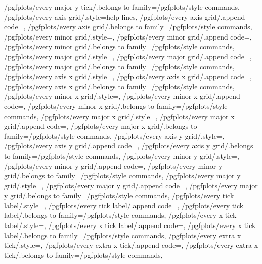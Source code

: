 {	/pgfplots/every major y tick/.belongs to family=/pgfplots/style commands,
	/pgfplots/every axis grid/.style={help lines},
	/pgfplots/every axis grid/.append code={},
	/pgfplots/every axis grid/.belongs to family=/pgfplots/style commands,
	/pgfplots/every minor grid/.style={},
	/pgfplots/every minor grid/.append code={},
	/pgfplots/every minor grid/.belongs to family=/pgfplots/style commands,
	/pgfplots/every major grid/.style={},
	/pgfplots/every major grid/.append code={},
	/pgfplots/every major grid/.belongs to family=/pgfplots/style commands,
	/pgfplots/every axis x grid/.style={},
	/pgfplots/every axis x grid/.append code={},
	/pgfplots/every axis x grid/.belongs to family=/pgfplots/style commands,
	/pgfplots/every minor x grid/.style={},
	/pgfplots/every minor x grid/.append code={},
	/pgfplots/every minor x grid/.belongs to family=/pgfplots/style commands,
	/pgfplots/every major x grid/.style={},
	/pgfplots/every major x grid/.append code={},
	/pgfplots/every major x grid/.belongs to family=/pgfplots/style commands,
	/pgfplots/every axis y grid/.style={},
	/pgfplots/every axis y grid/.append code={},
	/pgfplots/every axis y grid/.belongs to family=/pgfplots/style commands,
	/pgfplots/every minor y grid/.style={},
	/pgfplots/every minor y grid/.append code={},
	/pgfplots/every minor y grid/.belongs to family=/pgfplots/style commands,
	/pgfplots/every major y grid/.style={},
	/pgfplots/every major y grid/.append code={},
	/pgfplots/every major y grid/.belongs to family=/pgfplots/style commands,
	/pgfplots/every tick label/.style={},
	/pgfplots/every tick label/.append code={},
	/pgfplots/every tick label/.belongs to family=/pgfplots/style commands,
	/pgfplots/every x tick label/.style={},
	/pgfplots/every x tick label/.append code={},
	/pgfplots/every x tick label/.belongs to family=/pgfplots/style commands,
	/pgfplots/every extra x tick/.style={},
	/pgfplots/every extra x tick/.append code={},
	/pgfplots/every extra x tick/.belongs to family=/pgfplots/style commands,
}
